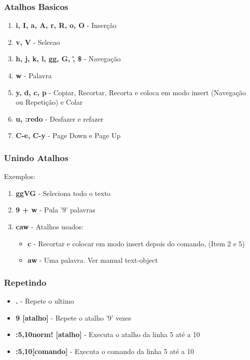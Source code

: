 \documentclass[aspectratio=169]{beamer}
\begin{document}
\begin{frame}\frametitle{Atalhos Basicos}
    \begin{enumerate}
        \item <1-> \textbf{i, I, a, A, r, R, o, O} - Inserção
        \item <2-> \textbf{v, V} - Selecao
        \item <3-> \textbf{h, j, k, l, gg, G, \^, \$} - Navegação
        \item <4-> \textbf{w} - Palavra
        \item <5-> \textbf{y, d, c, p} - Copiar, Recortar, Recorta e coloca em modo insert (Navegação ou Repetição) e Colar
        \item <6-> \textbf{u, :redo} - Desfazer e refazer
        \item <7-> \textbf{C-e, C-y} - Page Down e Page Up
    \end{enumerate}
\end{frame}

\begin{frame}\frametitle{Unindo Atalhos}
    Exemplos:
    \begin{enumerate}
        \item <1-> \textbf{ggVG} - Seleciona todo o texto
        \item <2-> \textbf{9 + w} - Pula '9' palavras
        \item <3-> \textbf{caw} - Atalhos usados:
            \begin{itemize}
                \item \textbf{c} - Recortar e colocar em modo insert depois do comando, (Item 2 e 5)
                \item \textbf{aw} - Uma palavra. Ver manual text-object
            \end{itemize}
    \end{enumerate}
\end{frame}

\begin{frame}\frametitle{Repetindo}
    \begin{itemize}
        \item <1-> \textbf{.} - Repete o ultimo
        \item <2-> \textbf{9 [atalho]} - Repete o atalho '9' vezes
        \item <3-> \textbf{:5,10norm! [atalho]} - Executa o atalho da linha 5 até a 10
        \item <4-> \textbf{:5,10[comando]} - Executa o comando da linha 5 até a 10
    \end{itemize}
\end{frame}
\end{document}
